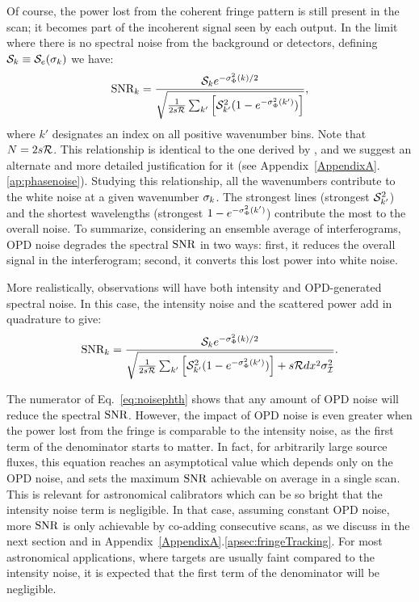 Of course, the power lost from the coherent fringe pattern is still present in the scan; 
it becomes part of the incoherent signal seen by each output. 
In the limit where there is no spectral noise from the background or detectors, defining $\S_k\equiv\S_e(\s_k) $ we have:
\begin{equation}
\SNR_k= \frac{\S_k e^{-\varPhir(k)/2}}{\sqrt{\frac{1}{2\samp\R}\sum_{k'} \left[\S_{k'}^2(1-e^{-\varPhir(k')})\right]}},
\label{eq:noiseph}
\end{equation}
where $k'$ designates an index on all positive wavenumber bins. Note that $N=2\samp\R$. This relationship is identical to the one derived by \citet{Meynart:1992fv}, and we suggest an alternate and more detailed justification for it (see Appendix~\ref{AppendixA}.\ref{ap:phasenoise}). Studying this relationship, all the wavenumbers contribute to the white noise at a given wavenumber $\s_k$. The strongest lines (strongest $\S^2_{k'}$) and the shortest wavelengths (strongest $1-e^{-\varPhir(k')}$) contribute the most to the overall noise.
To summarize, considering an ensemble average of interferograms, OPD noise degrades the spectral $\SNR$ in two ways: first, it reduces the overall signal in the interferogram; second, it converts this lost power into white noise.


More realistically, observations will have
both intensity and OPD-generated spectral noise. In this case, the intensity noise and the scattered power
add in quadrature to give:
\begin{equation}
\SNR_k = \frac{\S_k e^{-\varPhir(k)/2}}{\sqrt{\frac{1}{2\samp\R}\sum_{k'} \left[\S_{k'}^2(1-e^{-\varPhir(k')})\right] + \samp\R\Dx^2\varI}}.
\label{eq:noisephth}
\end{equation}

The numerator of Eq.~\ref{eq:noisephth} shows that any amount of OPD noise will reduce the spectral $\SNR$. However, the impact of OPD noise is even greater when the power lost from the fringe is comparable to the intensity noise, as the first term of the denominator starts to matter. In fact, for arbitrarily large source fluxes, this equation reaches an asymptotical value which depends only on the OPD noise, and sets the maximum $\SNR$ achievable on average in a single scan. This is relevant for astronomical calibrators which can be so bright that the intensity noise term is negligible. In that case, assuming constant OPD noise, more $\SNR$ is only achievable by co-adding consecutive scans, as we discuss in the next section and in Appendix~\ref{AppendixA}.\ref{apsec:fringeTracking}. For most astronomical applications, where targets are usually faint compared to the intensity noise, it is expected that the first term of the denominator will be negligible.



